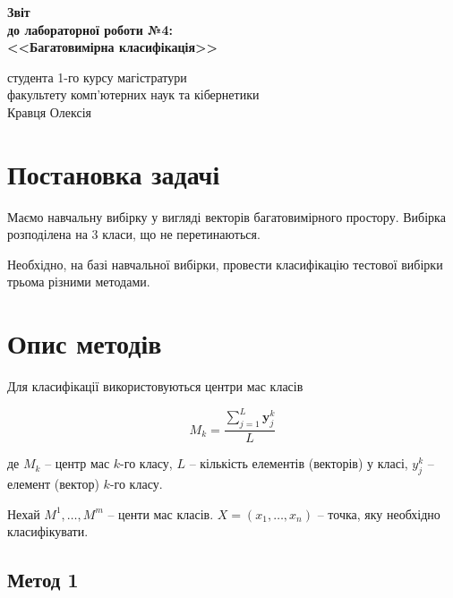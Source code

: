 \documentclass[a4paper,12pt]{article}
\begin{document}
	
	\begin{titlepage}
		\vspace*{6cm}
		\begin{center}
			
			\large
			\textbf{Звіт}\\
			\textbf{до лабораторної роботи №4:}\\
			\textbf{<<Багатовимірна класифікація>>}
			
		\end{center}
		
		\vspace{8cm}
		\begin{flushright}
			студента 1-го курсу магістратури\\
			факультету комп'ютерних наук та кібернетики\\
			Кравця Олексія
		\end{flushright}
		
	\end{titlepage}

\newpage
\tableofcontents
\newpage
\section{Постановка задачі}

Маємо навчальну вибірку у вигляді векторів багатовимірного простору. Вибірка розподілена на 3 класи, що не перетинаються.

Необхідно, на базі навчальної вибірки, провести класифікацію тестової вибірки трьома різними методами.

\section{Опис методів}

Для класифікації використовуються центри мас класів

\begin{displaymath}
	M_k =\frac{\sum_{j=1}^L \textbf{y}^k_j}{L}
\end{displaymath}

де $M_k$ -- центр мас $k$-го класу, $L$ -- кількість елементів (векторів) у класі, $y_j^k$ -- елемент (вектор) $k$-го класу.

Нехай $M^1, \ldots, M^m$ -- центи мас класів. $X = \left( x_1, \ldots, x_n \right)$ -- точка, яку необхідно класифікувати.

\subsection{Метод 1}
\end{document}
